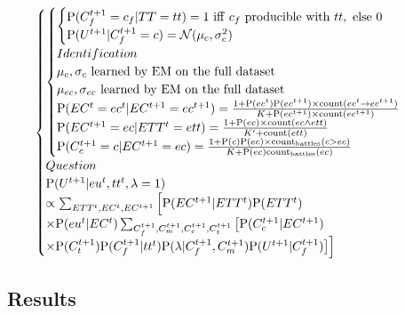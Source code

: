 \begin{eqnarray*}
\begin{cases}
\begin{cases}
\begin{cases}
            \PP(C_f^{t+1}=c_f|TT=tt) = 1\ \mathrm{iff\ } c_f\ \mathrm{producible\ with}\ tt,\ \mathrm{else}\ 0\\
            \PP(U^{t+1}|C_f^{t+1}=c) = \mathcal{N}(\mu_{c},\sigma_{c}^2)\\
        \end{cases}\\
    Identification\\
            \mu_{c},\sigma_{c}\ \mathrm{learned\ by\ EM\ on\ the\ full\ dataset}\\
            \mu_{ec},\sigma_{ec}\ \mathrm{learned\ by\ EM\ on\ the\ full\ dataset}\\
            \PP(EC^t=ec^t|EC^{t+1}=ec^{t+1}) = \frac{1+ \PP(ec^t)\PP(ec^{t+1}) \times \mathrm{count}(ec^t \rightarrow ec^{t+1})}{K+\PP(ec^{t+1})\times \mathrm{count}(ec^{t+1})}\\
            \PP(EC^{t+1}=ec|ETT^t=ett) = \frac{1 + \PP(ec) \times \mathrm{count}(ec \wedge ett)}{K' + \mathrm{count}(ett)}\\
            \PP(C_c^{t+1}=c | EC^{t+1}=ec) = \frac{1 + \PP(c)\PP(ec) \times \mathrm{count_{battles}}(c > ec)}{K + \PP(ec)\mathrm{count_{battles}}(ec)}\\
    \end{cases}\\
Question \\
 \PP(U^{t+1} | eu^t, tt^t, \lambda = 1) \\
 \propto \sum_{ETT^t, EC^t, EC^{t+1}}\Big[\PP(EC^{t+1}|ETT^t)\PP(ETT^t)\\
 \times \PP(eu^t|EC^t) \sum_{C_f^{t+1},C_m^{t+1},C_c^{t+1},C_t^{t+1}}\big[\PP(C_c^{t+1}|EC^{t+1})\\
 \times \PP(C_{t}^{t+1})\PP(C_{f}^{t+1}|tt^{t}) \PP(\lambda|C_{f}^{t+1},C_{m}^{t+1}) \PP(U^{t+1}|C_f^{t+1})\big]\Big]\\
\end{cases}\\
\end{eqnarray*}


\subsection{Results}



